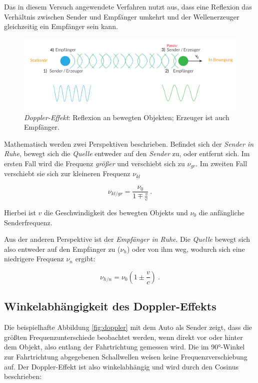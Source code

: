 Das in diesem Versuch angewendete Verfahren nutzt aus, dass eine Reflexion das Verhältnis zwischen Sender und Empfänger umkehrt und der Wellenerzeuger gleichzeitig ein Empfänger sein kann.

\begin{figure}
    \centering
    \includegraphics[width=.95\textwidth]{media/doppler_SE.pdf}
    \caption{\textit{Doppler-Effekt}: Reflexion an bewegten Objekten; Erzeuger ist auch Empfänger. \cite{doppler}}
    \label{fig:se}
\end{figure}

Mathematisch werden zwei Perspektiven beschrieben. Befindet sich der \textit{Sender in Ruhe}, bewegt sich die \textit{Quelle} entweder auf den \textit{Sender} zu, oder entfernt sich.
Im ersten Fall wird die Frequenz \textit{größer} und verschiebt sich zu $\nu_{gr}$. Im zweiten Fall verschiebt sie sich zur kleineren Frequenz $\nu_{kl}$

\begin{equation*}
    \nu_{kl/gr} = \frac{\nu_0}{1 \mp \frac{v}{c}} \:.
\end{equation*}

Hierbei ist $v$ die Geschwindigkeit des bewegten Objekts und $\nu_0$ die anfängliche Senderfrequenz.

Aus der anderen Perspektive ist der \textit{Empfänger in Ruhe}. Die \textit{Quelle} bewegt sich also entweder auf den Empfänger zu ($\nu_h$) oder von ihm weg, wodurch sich eine niedrigere
Frequenz $\nu_n$ ergibt:

\begin{equation*}
    \nu_{h/n} = \nu_0 (1 \pm \frac{v}{c}) \:.
\end{equation*}

\subsection{Winkelabhängigkeit des Doppler-Effekts}
Die beispielhafte Abbildung \ref{fig:doppler} mit dem Auto als Sender zeigt, dass die größten Frequenzunterschiede beobachtet werden, wenn direkt vor oder hinter dem Objekt,
also entlang der Fahrtrichtung gemessen wird. Die im 90°-Winkel zur Fahrtrichtung abgegebenen Schallwellen weisen keine Frequenzverschiebung auf. Der Doppler-Effekt ist also winkelabhängig und wird
durch den Cosinus beschrieben:

